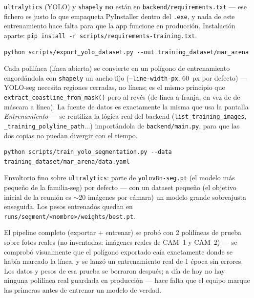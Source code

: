 \begin{warnbox}
\texttt{ultralytics} (YOLO) y \texttt{shapely} \textbf{no} están en
\texttt{backend/requirements.txt} — ese fichero es justo lo que empaqueta PyInstaller dentro
del \texttt{.exe}, y nada de este entrenamiento hace falta para que la app funcione en
producción. Instalación aparte: \texttt{pip install -r scripts/requirements-training.txt}.
\end{warnbox}

\begin{codebox}
\begin{verbatim}
python scripts/export_yolo_dataset.py --out training_dataset/mar_arena
\end{verbatim}
\end{codebox}

Cada polilínea (línea abierta) se convierte en un polígono de entrenamiento engordándola con
\texttt{shapely} un ancho fijo (\texttt{--line-width-px}, 60~px por defecto) — YOLO-seg necesita
regiones cerradas, no líneas; es el mismo principio que \texttt{extract\_coastline\_from\_mask()}
pero al revés (de línea a franja, en vez de de máscara a línea). La fuente de datos es
exactamente la misma que usa la pantalla \textit{Entrenamiento} — se reutiliza la lógica real del
backend (\texttt{list\_training\_images}, \texttt{\_training\_polyline\_path}...) importándola de
\texttt{backend/main.py}, para que las dos copias no puedan divergir con el tiempo.

\begin{codebox}
\begin{verbatim}
python scripts/train_yolo_segmentation.py --data training_dataset/mar_arena/data.yaml
\end{verbatim}
\end{codebox}

Envoltorio fino sobre \texttt{ultralytics}: parte de \texttt{yolov8n-seg.pt} (el modelo más
pequeño de la familia-seg) por defecto — con un dataset pequeño (el objetivo inicial de la
reunión es $\sim$20 imágenes por cámara) un modelo grande sobreajusta enseguida. Los pesos
entrenados quedan en \texttt{runs/segment/<nombre>/weights/best.pt}.

\begin{warnbox}
El pipeline completo (exportar + entrenar) se probó con 2 polilíneas de prueba sobre fotos
reales (no inventadas: imágenes reales de CAM~1 y CAM~2) — se comprobó visualmente que el
polígono exportado caía exactamente donde se había marcado la línea, y se lanzó un entrenamiento
real de 1 época sin errores. Los datos y pesos de esa prueba se borraron después; a día de hoy
no hay ninguna polilínea real guardada en producción — hace falta que el equipo marque las
primeras antes de entrenar un modelo de verdad.
\end{warnbox}

\appendix

